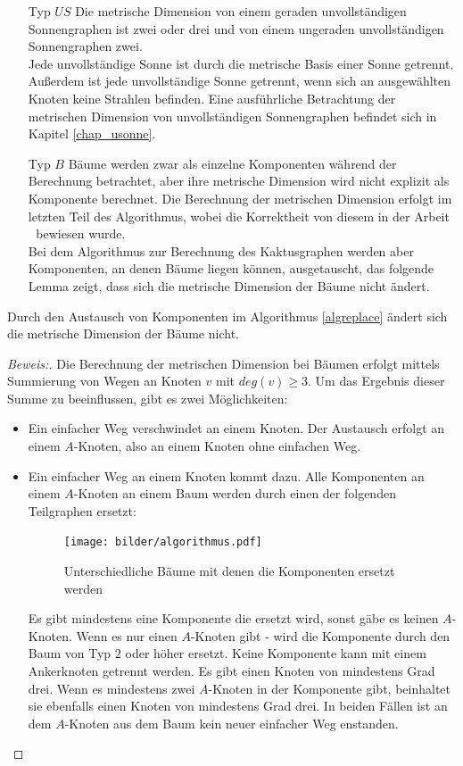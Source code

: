 \begin{itemize}
\item[Typ $US$]
Die metrische Dimension von einem geraden unvollständigen Sonnengraphen ist zwei oder drei und von einem ungeraden unvollständigen Sonnengraphen zwei.\\
Jede unvollständige Sonne ist durch die metrische Basis einer Sonne getrennt. Außerdem ist jede unvollständige Sonne getrennt, wenn sich an ausgewählten Knoten keine Strahlen befinden. Eine ausführliche Betrachtung der metrischen Dimension von unvollständigen Sonnengraphen befindet sich in Kapitel \ref{chap_usonne}.
\item[Typ $B$]
Bäume werden zwar als einzelne Komponenten während der Berechnung betrachtet, aber ihre metrische Dimension wird nicht explizit als Komponente berechnet. Die Berechnung der metrischen Dimension erfolgt im letzten Teil des Algorithmus, wobei die Korrektheit von diesem in der Arbeit \grqq$\;$\cite{landmarks} bewiesen wurde.\\
Bei dem Algorithmus zur Berechnung des Kaktusgraphen werden aber Komponenten, an denen Bäume liegen können, ausgetauscht, das folgende Lemma zeigt, dass sich die metrische Dimension der Bäume nicht ändert.
\end{itemize}
\begin{lem}
Durch den Austausch von Komponenten im Algorithmus \ref{algreplace} ändert sich die metrische Dimension der Bäume nicht.
\end{lem}\vspace{-6mm}
\begin{proof}[Beweis:]
Die Berechnung der metrischen Dimension bei Bäumen erfolgt mittels Summierung von Wegen an Knoten $v$ mit $deg(v)\geq 3$. Um das Ergebnis dieser Summe zu beeinflussen, gibt es zwei Möglichkeiten:
\begin{itemize}
\item Ein einfacher Weg verschwindet an einem Knoten. Der Austausch erfolgt an einem $A$-Knoten, also an einem Knoten ohne einfachen Weg. 
\item Ein einfacher Weg an einem Knoten kommt dazu. Alle Komponenten an einem $A$-Knoten an einem Baum werden durch einen der folgenden Teilgraphen ersetzt:
\vspace{-4mm}
\begin{figure}[h!]
		\centering 		 
   \texttt{[image: bilder/algorithmus.pdf]}
	\caption{Unterschiedliche Bäume mit denen die Komponenten ersetzt werden}
  	 \end{figure}
  	 \vspace{-3mm}
Es gibt mindestens eine Komponente die ersetzt wird, sonst gäbe es keinen $A$-Knoten. Wenn es nur einen $A$-Knoten gibt - wird die Komponente durch den Baum von Typ $2$ oder höher ersetzt. Keine Komponente kann mit einem Ankerknoten getrennt werden. Es gibt einen Knoten von mindestens Grad drei. Wenn es mindestens zwei $A$-Knoten in der Komponente gibt, beinhaltet sie ebenfalls einen Knoten von mindestens Grad drei. In beiden Fällen ist an dem $A$-Knoten aus dem Baum kein neuer einfacher Weg enstanden.
\end{itemize}
\vspace{-1mm}
\end{proof}
\vspace{-12mm}
